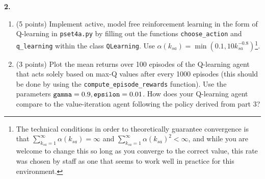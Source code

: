 \documentclass[12pt]{amsart}
\newenvironment{statement}[1]{\smallskip\noindent\color[rgb]{0.0,0.0,0.0} {\bf #1.}}{}
\newcommand{\1}{\mathds{1}}
\begin{document}
\begin{statement}{2}
\begin{enumerate}
    \item (5 points) Implement active, model free reinforcement learning in the form of Q-learning in \texttt{pset4a.py} by filling out the functions \verb|choose_action| and \verb|q_learning| within the class \verb|QLearning|.
    Use $\alpha(k_{sa}) = \min(0.1, 10 k_{sa}^{-0.8})$\footnote{The technical conditions in order to theoretically guarantee convergence is that $\sum_{k_{sa}=1}^\infty \alpha(k_{sa}) = \infty$ and $\sum_{k_{sa}=1}^\infty \alpha(k_{sa})^2 < \infty$, and while you are welcome to change this so long as you converge to the correct value, this rate was chosen by staff as one that seems to work well in practice for this environment.}.
    
    \item (3 points) Plot the mean returns over 100 episodes of the Q-learning agent that acts solely based on max-Q values after every 1000 episodes (this should be done by using the \verb|compute_episode_rewards| function). Use the parameters $\verb|gamma|=0.9, \verb|epsilon|=0.01$. How does your Q-learning agent compare to the value-iteration agent following the policy derived from part 3?
\end{enumerate}
\end{statement}
\end{document}
